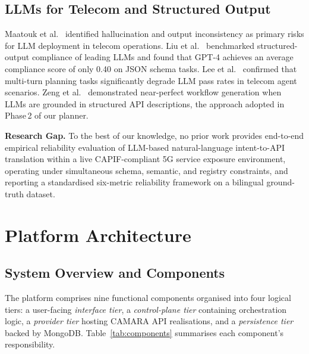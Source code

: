 \documentclass[conference]{IEEEtran}
\begin{document}
\subsection{LLMs for Telecom and Structured Output}

Maatouk et al.~\cite{maatouk2025} identified hallucination and output
inconsistency as primary risks for LLM deployment in telecom operations.
Liu et al.~\cite{liu2024} benchmarked structured-output compliance of
leading LLMs and found that GPT-4 achieves an average compliance score
of only 0.40 on JSON schema tasks.
Lee et al.~\cite{telagentbench2025} confirmed that multi-turn planning
tasks significantly degrade LLM pass rates in telecom agent scenarios.
Zeng et al.~\cite{flowmind2023} demonstrated near-perfect workflow
generation when LLMs are grounded in structured API descriptions,
the approach adopted in Phase\,2 of our planner.

\noindent\textbf{Research Gap.}
To the best of our knowledge, no prior work provides end-to-end empirical
reliability evaluation of LLM-based natural-language intent-to-API
translation within a live CAPIF-compliant 5G service exposure environment,
operating under simultaneous schema, semantic, and registry constraints,
and reporting a standardised six-metric reliability framework on a
bilingual ground-truth dataset.

\section{Platform Architecture}
\label{sec:arch}

\subsection{System Overview and Components}

The platform comprises nine functional components organised into four
logical tiers: a user-facing \emph{interface tier}, a
\emph{control-plane tier} containing orchestration logic, a
\emph{provider tier} hosting CAMARA API realisations, and a
\emph{persistence tier} backed by MongoDB.
Table~\ref{tab:components} summarises each component's responsibility.
\end{document}
